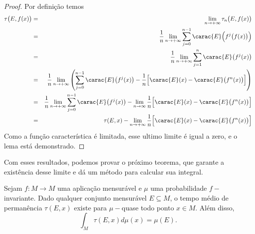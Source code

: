 \begin{proof} Por definição temos 
\begin{eqnarray*}
\tau\big(E,f(x)\big) & = & \lim_{n\to+\infty}\tau_n\big(E,f(x)\big)\\
& = & \dfrac{1}{n}\lim_{n\to+\infty}\sum_{j=0}^{n-1}\carac{E}\Big(f^j\big(f(x)\big)\Big)\\
& = & \dfrac{1}{n}\lim_{n\to+\infty}\sum_{j=1}^{n}\carac{E}\big(f^j(x)\big)\\
& = & \dfrac{1}{n}\lim_{n\to+\infty}\left(\sum_{j=0}^{n-1}\carac{E}\big(f^j(x)\big)-\dfrac{1}{n}\Big[\carac{E}(x)-\carac{E}\big(f^n(x)\big)\Big]\right)\\
& = & \dfrac{1}{n}\lim_{n\to+\infty}\sum_{j=0}^{n-1}\carac{E}\big(f^j(x)\big)-\lim_{n\to\infty}\dfrac{1}{n}\Big[\carac{E}(x)-\carac{E}\big(f^n(x)\big)\Big]\\
& = & \tau(E,x)-\lim_{n\to+\infty}\dfrac{1}{n}\Big[\carac{E}(x)-\carac{E}\big(f^n(x)\big)\Big]
\end{eqnarray*}
Como a função característica é limitada, esse ultimo limite é igual a zero, e o lema está demonstrado.
\end{proof}

Com esses resultados, podemos provar o próximo teorema, que garante a existência desse limite e dá um método para calcular sua integral.

\begin{teorema}\label{teb1} Sejam $f:M\to M$ uma aplicação mensurável e $\mu$ uma probabilidade $f-$invariante. Dado qualquer conjunto mensurável $E\subseteq M$, o tempo médio de permanência $\tau(E,x)$ existe para $\mu-$quase todo ponto $x\in M$. Além disso, 
\begin{equation}\label{eqteb1}
\int_{M}\tau(E,x)d\mu(x)=\mu(E).
\end{equation}
\end{teorema}

